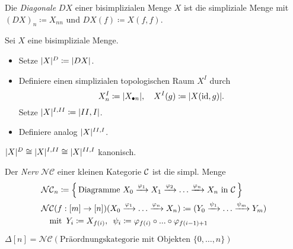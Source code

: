 \documentclass{cheat-sheet}
\newcommand{\NCat}{\mathcal{NC}} %
\begin{document}
\begin{samepage}

\begin{defn}
  Die \emph{Diagonale} $DX$ einer bisimplizialen Menge $X$ ist die simpliziale Menge mit
  $(DX)_n \coloneqq X_{nn}$ und $DX(f) \coloneqq X(f, f)$.
\end{defn}

\begin{defn}
  Sei $X$ eine bisimpliziale Menge.
  \begin{itemize}
    \item Setze $\lvert X\rvert^D \coloneqq \lvert DX\rvert$.
    \item Definiere einen simplizialen topologischen Raum $X^I$ durch
    \[ X^I_n \coloneqq \lvert X_{\bullet n}\rvert, \quad X^I(g) \coloneqq \lvert X(\operatorname{id}, g)\rvert. \]
    Setze $\lvert X\rvert^{I,II} \coloneqq \lvert II,I\rvert$.
    \item Definiere analog $\lvert X\rvert^{II,I}$.
  \end{itemize}
\end{defn}

\begin{satz}
  $\lvert X\rvert^D \cong \lvert X\rvert^{I,II} \cong \lvert X\rvert^{II,I}$ kanonisch.
\end{satz}

\begin{defn}
  Der \emph{Nerv} $\NCat$ einer kleinen Kategorie $\mathcal{C}$ ist die simpl. Menge
  \begin{align*}
    & \NCat_n \coloneqq \left\{ \, \text{Diagramme } X_0 \xrightarrow{\varphi_1} X_1 \xrightarrow{\varphi_2} \ldots \xrightarrow{\varphi_n} X_n \text{ in $\Cat$} \, \right\} \\
    & \NCat(f : [m] \to [n])(X_0 \xrightarrow{\varphi_1} \ldots \xrightarrow{\varphi_n} X_n) \coloneqq 
    ( Y_0 \xrightarrow{\psi_1} \ldots \xrightarrow{\psi_m} Y_m) \\
    & \quad \text{mit} \enspace Y_i \coloneqq X_{f(i)}, \enspace \psi_i \coloneqq \varphi_{f(i)} \circ \nldots \circ \varphi_{f(i-1)+1}
  \end{align*}
\end{defn}

\begin{bsp}
 $\Delta[n] = \NCat(\text{Präordnungskategorie mit Objekten } \{ 0, \ldots, n \})$
\end{bsp}


\end{samepage}
\end{document}

